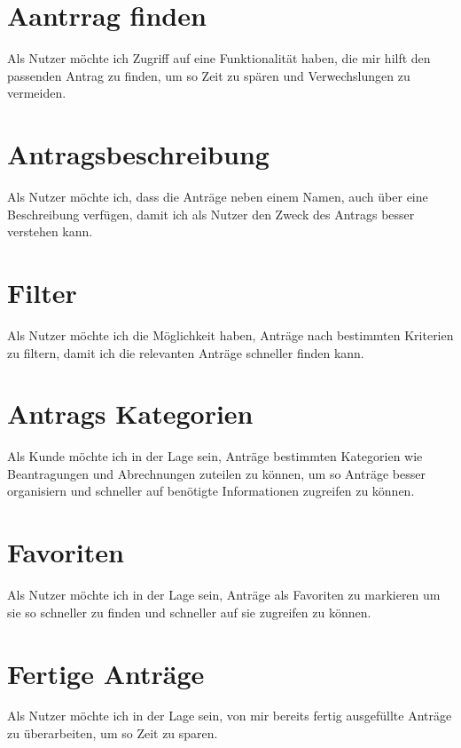 \section{Aantrrag finden}
Als Nutzer möchte ich Zugriff auf eine Funktionalität haben, die mir hilft den passenden 
Antrag zu finden, um so Zeit zu spären und Verwechslungen zu vermeiden.
\section{Antragsbeschreibung}
Als Nutzer möchte ich, dass die Anträge neben einem Namen, auch über eine Beschreibung verfügen, damit
ich als Nutzer den Zweck des Antrags besser verstehen kann.
\section{Filter}
Als Nutzer möchte ich die Möglichkeit haben, Anträge nach bestimmten Kriterien zu filtern, 
damit ich die relevanten Anträge schneller finden kann.
\section{Antrags Kategorien}
Als Kunde möchte ich in der Lage sein, Anträge bestimmten Kategorien wie Beantragungen und 
Abrechnungen zuteilen zu können, um so Anträge besser organisiern und schneller auf benötigte 
Informationen zugreifen zu können.
\section{Favoriten}
Als Nutzer möchte ich in der Lage sein, Anträge als Favoriten zu markieren um sie so schneller zu 
finden und schneller auf sie zugreifen zu können.
\section{Fertige Anträge}
Als Nutzer möchte ich in der Lage sein, von mir bereits fertig ausgefüllte Anträge zu überarbeiten, um 
so Zeit zu sparen.